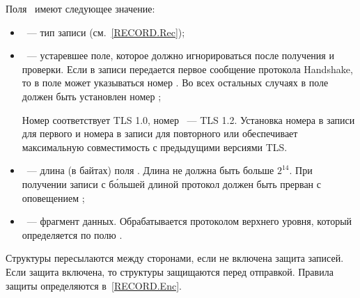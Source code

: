 Поля~ имеют следующее значение:
\begin{itemize}
\item
{}~--- тип записи (см.~\ref{RECORD.Rec});

\item
{}~--- устаревшее поле, которое должно игнорироваться 
после получения и проверки. 
%
Если в записи передается первое сообщение  протокола 
Handshake, то в поле может указываться номер .
%
Во всех остальных случаях в поле должен быть установлен номер ;

\begin{note*}
Номер  соответствует TLS 1.0, номер ~--- TLS 1.2.
Установка номера  в записи для первого   
и номера  в записи для повторного  или 
 обеспечивает максимальную совместимость 
с предыдущими версиями TLS.
%
\end{note*}

\item
{}~--- длина (в байтах) поля . 
Длина не должна быть больше $2^{14}$. При получении записи с б\'{о}льшей длиной 
протокол должен быть прерван с оповещением 
;

\item
{}~--- фрагмент данных. Обрабатывается протоколом верхнего уровня, 
который определяется по полю .
\end{itemize}

Структуры  пересылаются между сторонами, если не включена 
защита записей. Если защита включена, то структуры защищаются перед отправкой. 
Правила защиты определяются в~\ref{RECORD.Enc}.
